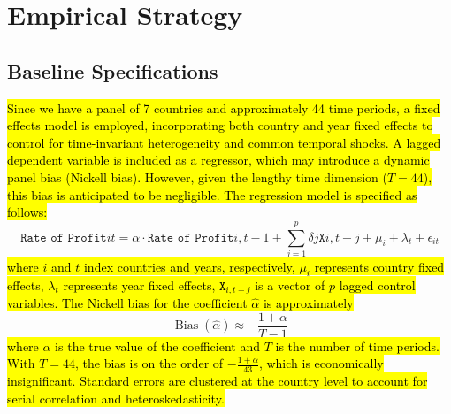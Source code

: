 \documentclass[10pt]{article}
\begin{document}



\section{Empirical Strategy}
\subsection{Baseline Specifications}
\hl{Since we have a panel of 7 countries and approximately 44 time periods, a fixed effects model is employed, incorporating both country and year fixed effects to control for time-invariant heterogeneity and common temporal shocks. A lagged dependent variable is included as a regressor, which may introduce a dynamic panel bias (Nickell bias). However, given the lengthy time dimension ($T = 44$), this bias is anticipated to be negligible. The regression model is specified as follows:}
\begin{equation*}
\texttt{Rate of Profit}{it} = \alpha \cdot \texttt{Rate of Profit}{i,t-1} + \sum_{j=1}^{p} \delta {j} \texttt{X}{i,t-j} + \mu_{i} + \lambda_t + \epsilon_{it}
\end{equation*}
\hl{where $i$ and $t$ index countries and years, respectively, $\mu_i$ represents country fixed effects, $\lambda_t$ represents year fixed effects, $\texttt{X}_{i,t-j}$ is a vector of $p$ lagged control variables. The Nickell bias for the coefficient $\hat{\alpha}$ is approximately} 
\begin{equation*}
\operatorname{Bias}(\hat{\alpha}) \approx -\frac{1 + \alpha}{T - 1}
\end{equation*}
\hl{where $\alpha$ is the true value of the coefficient and $T$ is the number of time periods. With $T = 44$, the bias is on the order of $-\frac{1 + \alpha}{43}$, which is economically insignificant. Standard errors are clustered at the country level to account for serial correlation and heteroskedasticity.}
\end{document}
